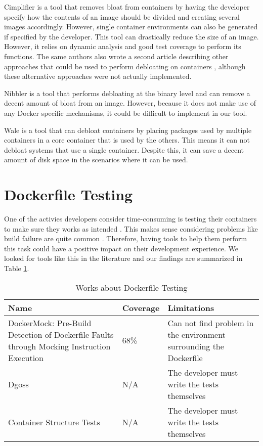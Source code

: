 Cimplifier \cite{rastogiCimplifierAutomaticallyDebloating2017} is a tool that removes bloat from containers by having the developer specify how the contents of an image should be divided and creating several images accordingly. However, single container environments can also be generated if specified by the developer. This tool can drastically reduce the size of an image. However, it relies on dynamic analysis and good test coverage to perform its functions. The same authors also wrote a second article describing other approaches that could be used to perform debloating on containers \cite{rastogiNewDirectionsContainer2017}, although these alternative approaches were not actually implemented.

Nibbler \cite{agadakosLargescaleDebloatingBinary2020} is a tool that performs debloating at the binary level and can remove a decent amount of bloat from an image. However, because it does not make use of any Docker specific mechanisms, it could be difficult to implement in our tool.

Wale \cite{santoroWaleDockerfileBasedApproach2018} is a tool that can debloat containers by placing packages used by multiple containers in a core container that is used by the others. This means it can not debloat systems that use a single container. Despite this, it can save a decent amount of disk space in the scenarios where it can be used.

\section{Dockerfile Testing} \label{sec:dockerfile_testing}

One of the activies developers consider time-consuming is testing their containers to make sure they works as intended \cite{reisDevelopingDockerDockerCompose2022}. This makes sense considering problems like build failure are quite common \cite{wuEmpiricalStudyBuild2020}. Therefore, having tools to help them perform this task could have a positive impact on their development experience. We looked for tools like this in the literature and our findings are summarized in Table \ref{tab:works_dockerfile_testing}.

\begin{table}[H]
    \centering
    \begin{tabular}{|p{}|p{}|p{}|}
        \hline \textbf{Name} & \textbf{Coverage} & \textbf{Limitations} \\
        \hline DockerMock: Pre-Build Detection of Dockerfile Faults through Mocking Instruction Execution \cite{liDockerMockPreBuildDetection2021} & 68\% & Can not find problem in the environment surrounding the Dockerfile \\
        \hline Dgoss \footnotemark[7]{} & N/A & The developer must write the tests themselves \\
        \hline Container Structure Tests \footnotemark[8]{} & N/A & The developer must write the tests themselves \\
        \hline
    \end{tabular}
    \caption{Works about Dockerfile Testing}
    \label{tab:works_dockerfile_testing}
\end{table}

